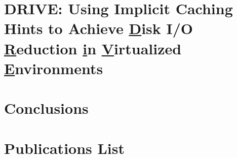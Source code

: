 \documentclass[12pt, a4paper, twoside]{article}
\begin{document}
\newpage
\section{DRIVE: Using Implicit Caching Hints to Achieve \underline{D}isk I/O \underline{R}eduction \underline{i}n \underline{V}irtualized \underline{E}nvironments} 
\label{sec:synopsis-drive}


%

%

\newpage
\section{Conclusions}
\label{sec:synopsis-conclusions}


\newpage
\footnotesize




\newpage
\section*{Publications List}
\label{chap:publications}


\printindex
\end{document}
